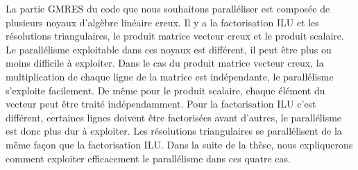 La partie GMRES du code que nous souhaitons paralléliser est composée de plusieurs noyaux d'algèbre linéaire creux.
%
Il y a la factorisation ILU et les résolutions triangulaires, le produit matrice vecteur creux et le produit scalaire.
%
Le parallélisme exploitable dans ces noyaux est différent, il peut être plus ou moins difficile à exploiter.
%
Dans le cas du produit matrice vecteur creux, la multiplication de chaque ligne de la matrice est indépendante, le parallélisme s'exploite facilement.
%
De même pour le produit scalaire, chaque élément du vecteur peut être traité indépendamment.
%
Pour la factorisation ILU c'est différent, certaines lignes doivent être factorisées avant d'autres, le parallélisme est donc plus dur à exploiter.
%
Les résolutions triangulaires se parallélisent de la même façon que la factorisation ILU.
%
Dans la suite de la thèse, nous expliquerons comment exploiter efficacement le parallélisme dans ces quatre cas.
